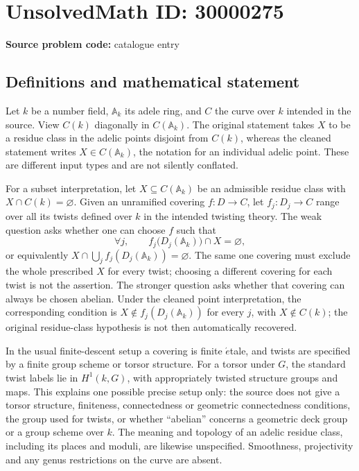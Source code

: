 \documentclass[11pt]{article}
\newcommand{\A}{\mathbb{A}}
\begin{document}
\section*{UnsolvedMath ID: 30000275}
\textbf{Source problem code:} catalogue entry
\subsection{Definitions and mathematical statement}
Let \(k\) be a number field, \(\A_k\) its adele ring, and \(C\) the curve over \(k\) intended in the source. View \(C(k)\) diagonally in \(C(\A_k)\). The original statement takes \(X\) to be a residue class in the adelic points disjoint from \(C(k)\), whereas the cleaned statement writes \(X\in C(\A_k)\), the notation for an individual adelic point. These are different input types and are not silently conflated.

For a subset interpretation, let \(X\subseteq C(\A_k)\) be an admissible residue class with \(X\cap C(k)=\varnothing\). Given an unramified covering \(f:D\to C\), let \(f_j:D_j\to C\) range over all its twists defined over \(k\) in the intended twisting theory. The weak question asks whether one can choose \(f\) such that
\[
 \forall j,\qquad f_j\bigl(D_j(\A_k)\bigr)\cap X=\varnothing,
\]
or equivalently \(X\cap\bigcup_j f_j(D_j(\A_k))=\varnothing\). The same one covering must exclude the whole prescribed \(X\) for every twist; choosing a different covering for each twist is not the assertion. The stronger question asks whether that covering can always be chosen abelian. Under the cleaned point interpretation, the corresponding condition is \(X\notin f_j(D_j(\A_k))\) for every \(j\), with \(X\notin C(k)\); the original residue-class hypothesis is not then automatically recovered.

In the usual finite-descent setup a covering is finite \(\acute{e}\)tale, and twists are specified by a finite group scheme or torsor structure. For a torsor under \(G\), the standard twist labels lie in \(H^1(k,G)\), with appropriately twisted structure groups and maps. This explains one possible precise setup only: the source does not give a torsor structure, finiteness, connectedness or geometric connectedness conditions, the group used for twists, or whether ``abelian'' concerns a geometric deck group or a group scheme over \(k\). The meaning and topology of an adelic residue class, including its places and moduli, are likewise unspecified. Smoothness, projectivity and any genus restrictions on the curve are absent.
\end{document}
